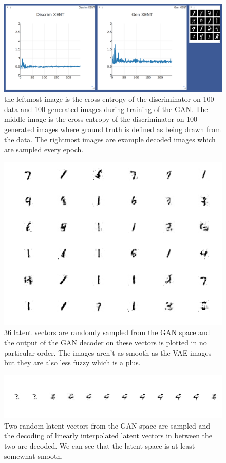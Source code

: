 \documentclass[11pt]{article}
\begin{document}
\begin{figure}
  \centering
  \includegraphics[width=15cm]{imgs/gan-train}
  \caption{\label{fig:gantrain} the leftmost image is the cross entropy of the discriminator on 100 data and 100 generated images during training of the GAN. The middle image is the cross entropy of the discriminator on 100 generated images where ground truth is defined as being drawn from the data. The rightmost images are example decoded images which are sampled every epoch.}
\end{figure}

\begin{figure}
  \centering
  \includegraphics[width=15cm]{imgs/gan_decode2}
  \caption{\label{fig:gangrid} 36 latent vectors are randomly sampled from the GAN space and the output of the GAN decoder on these vectors is plotted in no particular order. The images aren't as smooth as the VAE images but they are also less fuzzy which is a plus.}
\end{figure}

\begin{figure}
  \centering
  \includegraphics[width=15cm]{imgs/gan_12}
  \caption{\label{fig:gan_12} Two random latent vectors from the GAN space are sampled and the decoding of linearly interpolated latent vectors in between the two are decoded. We can see that the latent space is at least somewhat smooth.}
\end{figure}
\end{document}
